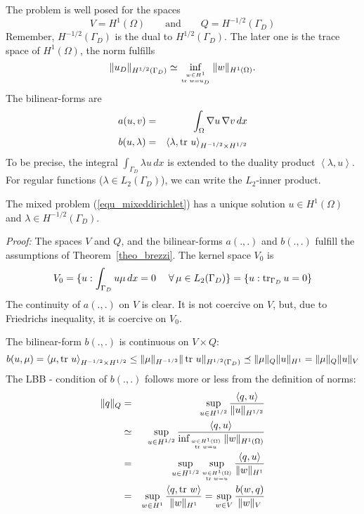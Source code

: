 The problem is well posed for the spaces
$$
V = H^1(\Omega) \qquad \mbox{and} \qquad Q = H^{-1/2}(\Gamma_D)
$$
Remember, $H^{-1/2}(\Gamma_D)$ is the dual to $H^{1/2}(\Gamma_D)$.
The later one is the trace space of $H^1(\Omega)$, the norm fulfills
$$
\| u_D \|_{H^{1/2}(\Gamma_D)} \simeq \inf_{ w \in H^1 \atop \operatorname{tr} \, w = u_D} \| w \|_{H^1(\Omega)}.
$$
The bilinear-forms are
\begin{eqnarray*}
a(u,v) & = & \int_\Omega \nabla u \, \nabla v \, dx  \\
b(u,\lambda) & = & \left< \lambda, \operatorname{tr} \, u \right>_{H^{-1/2} \times H^{1/2}}
\end{eqnarray*}
To be precise, the integral $\int_{\Gamma_D} \lambda u \, dx$ is extended
to the duality product $\left< \lambda, u \right>$. For regular 
functions ($\lambda \in L_2(\Gamma_D)$), we can write the $L_2$-inner
product.

\begin{theorem} The mixed problem (\ref{equ_mixeddirichlet}) has
a unique solution $u \in H^1(\Omega)$ and $\lambda \in H^{-1/2}(\Gamma_D)$.
\end{theorem}
{\em Proof:} 
The spaces $V$ and $Q$, and the bilinear-forms $a(.,.)$ and
$b(.,.)$ fulfill the assumptions of Theorem~\ref{theo_brezzi}.
The kernel space $V_0$ is
$$
V_0 = \{ u : \int_{\Gamma_D} u \mu \, dx = 0 \; \quad \forall \, \mu \in L_2(\Gamma_D) \} = \{ u : \operatorname{tr}_{\Gamma_D} u = 0 \}
$$
The continuity of $a(.,.)$ on $V$ is clear. It is not coercive
on $V$, but, due to Friedrichs inequality, it is coercive on $V_0$.

The bilinear-form $b(.,.)$ is continuous on $V \times Q$:
$$
b(u,\mu) = \left< \mu, \operatorname{tr} \, u  \right>_{H^{-1/2} \times H^{1/2} }
 \leq \| \mu \|_{H^{-1/2}} \| \operatorname{tr} \, u \|_{H^{1/2}(\Gamma_D)} 
 \preceq \| \mu \|_Q \| u \|_{H^1} = \| \mu \|_Q \| u \|_V
$$
The LBB - condition of $b(.,.)$ follows more or less from the definition
of norms:
\begin{eqnarray*}
\| q \|_Q & = & \sup_{u \in H^{1/2}} \frac{ \left< q, u \right> }{ \| u \|_{H^{1/2}}} \\
        & \simeq & \sup_{u \in H^{1/2}} \frac{ \left< q, u \right> }{ \inf_{w \in H^1(\Omega) \atop \operatorname{tr} \, w = u} \| w \|_{H^1(\Omega)}} \\
        & = & \sup_{u \in H^{1/2}} \sup_{w \in H^1(\Omega) \atop \operatorname{tr} \, w = u} \frac{ \left< q, u \right> }{ \| w \|_{H^1}} \\
        & = & \sup_{w \in H^1} \frac{ \left< q, \operatorname{tr} \, w \right> }{ \| w \|_{H^1}} 
        = \sup_{w \in V} \frac{b(w,q)}{\| w \|_V}
\end{eqnarray*}


